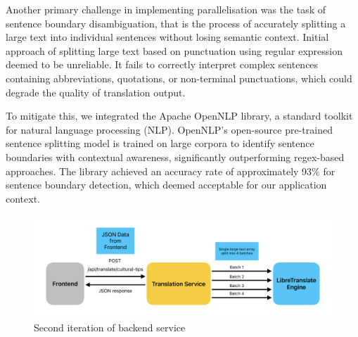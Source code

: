 Another primary challenge in implementing parallelisation was the task of sentence boundary disambiguation, that is the process of accurately splitting a large text into individual sentences without losing semantic context. Initial approach of splitting large text based on punctuation using regular expression deemed to be unreliable. It fails to correctly interpret complex sentences containing abbreviations, quotations, or non-terminal punctuations, which could degrade the quality of translation output\cite{walker_et_al_2001}.

To mitigate this, we integrated the Apache OpenNLP library, a standard toolkit for natural language processing (NLP). OpenNLP's open-source pre-trained sentence splitting model\cite{apache_opennlp_models} is trained on large corpora to identify sentence boundaries with contextual awareness, significantly outperforming regex-based approaches. The library achieved an accuracy rate of approximately 93\% for sentence boundary detection, which deemed acceptable for our application context\cite{apache_opennlp_manual_2_3_2}.

\begin{figure}[H]
    \centering
    \includegraphics[width=1\linewidth]{images/Backend_Documents/Backend_Iteration_2.pdf}
    \caption{Second iteration of backend service}
    \label{fig:backend_iteration_2}
\end{figure}

